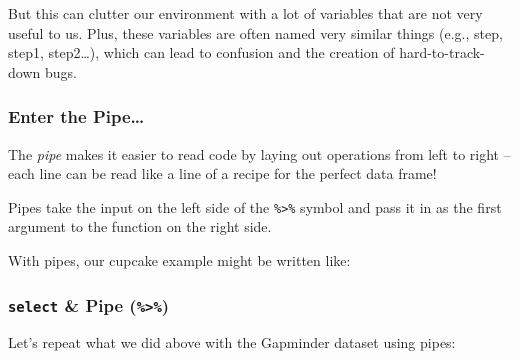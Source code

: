 \documentclass[]{book}
\newenvironment{Shaded}{\begin{snugshade}}{\end{snugshade}}
\newcommand{\KeywordTok}[1]{\textcolor[rgb]{0.13,0.29,0.53}{\textbf{#1}}}
\newcommand{\StringTok}[1]{\textcolor[rgb]{0.31,0.60,0.02}{#1}}
\newcommand{\OperatorTok}[1]{\textcolor[rgb]{0.81,0.36,0.00}{\textbf{#1}}}
\newcommand{\NormalTok}[1]{#1}
\begin{document}
But this can clutter our environment with a lot of variables that are
not very useful to us. Plus, these variables are often named very
similar things (e.g., step, step1, step2\ldots{}), which can lead to
confusion and the creation of hard-to-track-down bugs.

\subsubsection*{Enter the Pipe\ldots{}}\label{enter-the-pipe}

The \emph{pipe} makes it easier to read code by laying out operations
from left to right -- each line can be read like a line of a recipe for
the perfect data frame!

Pipes take the input on the left side of the \texttt{\%\textgreater{}\%}
symbol and pass it in as the first argument to the function on the right
side.

With pipes, our cupcake example might be written like:

\begin{Shaded}
\end{Shaded}

\subsubsection*{\texorpdfstring{\texttt{select} \& Pipe
(\texttt{\%\textgreater{}\%})}{select \& Pipe (\%\textgreater{}\%)}}\label{select-pipe}

Let's repeat what we did above with the Gapminder dataset using pipes:

\begin{Shaded}
\end{Shaded}
\end{document}
